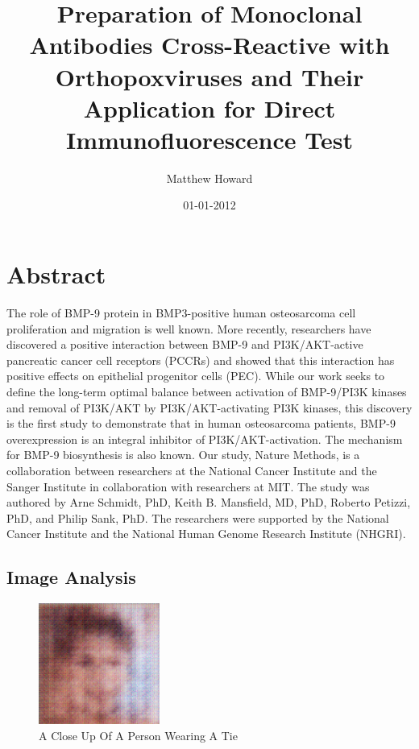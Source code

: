 \documentclass{article}%
\title{Preparation of Monoclonal Antibodies Cross{-}Reactive with Orthopoxviruses and Their Application for Direct Immunofluorescence Test}%
\author{Matthew Howard}%
\affil{Department of Genetics, Washington University School of Medicine, St. Louis, Missouri, United States of America}%
\date{01{-}01{-}2012}%
\begin{document}
%
\normalsize%
\maketitle%
\section{Abstract}%
\label{sec:Abstract}%
The role of BMP{-}9 protein in BMP3{-}positive human osteosarcoma cell proliferation and migration is well known. More recently, researchers have discovered a positive interaction between BMP{-}9 and PI3K/AKT{-}active pancreatic cancer cell receptors (PCCRs) and showed that this interaction has positive effects on epithelial progenitor cells (PEC). While our work seeks to define the long{-}term optimal balance between activation of BMP{-}9/PI3K kinases and removal of PI3K/AKT by PI3K/AKT{-}activating PI3K kinases, this discovery is the first study to demonstrate that in human osteosarcoma patients, BMP{-}9 overexpression is an integral inhibitor of PI3K/AKT{-}activation. The mechanism for BMP{-}9 biosynthesis is also known. Our study, Nature Methods, is a collaboration between researchers at the National Cancer Institute and the Sanger Institute in collaboration with researchers at MIT.\newline%
The study was authored by Arne Schmidt, PhD, Keith B. Mansfield, MD, PhD, Roberto Petizzi, PhD, and Philip Sank, PhD. The researchers were supported by the National Cancer Institute and the National Human Genome Research Institute (NHGRI).

%
\subsection{Image Analysis}%
\label{subsec:ImageAnalysis}%


\begin{figure}[h!]%
\centering%
\includegraphics[width=150px]{500_fake_images/samples_5_274.png}%
\caption{A Close Up Of A Person Wearing A Tie}%
\end{figure}

%
\end{document}
